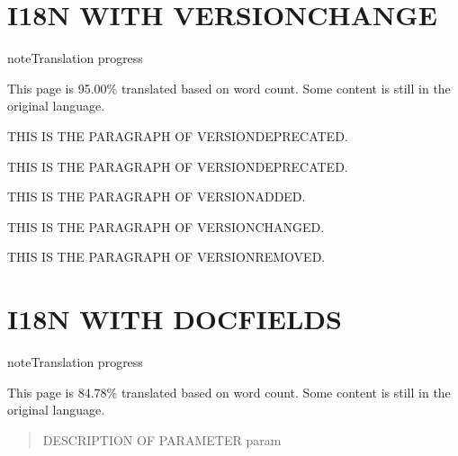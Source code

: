 \documentclass[letterpaper,10pt,english]{sphinxmanual}
\begin{document}
\sphinxstepscope


\chapter{I18N WITH VERSIONCHANGE}
\label{\detokenize{versionchange:i18n-with-versionchange}}\label{\detokenize{versionchange::doc}}
\begin{sphinxadmonition}{note}{Translation progress}

\sphinxAtStartPar
This page is 95.00\% translated based on word count. Some content is still in the original language.
\end{sphinxadmonition}

\sphinxAtStartPar
{}THIS IS THE  PARAGRAPH OF VERSION\sphinxhyphen{}DEPRECATED.

\sphinxAtStartPar
THIS IS THE  PARAGRAPH OF VERSION\sphinxhyphen{}DEPRECATED.

\sphinxAtStartPar
{}THIS IS THE  PARAGRAPH OF VERSION\sphinxhyphen{}ADDED.

\sphinxAtStartPar
{}THIS IS THE  PARAGRAPH OF VERSION\sphinxhyphen{}CHANGED.

\sphinxAtStartPar
{}THIS IS THE  PARAGRAPH OF VERSION\sphinxhyphen{}REMOVED.

\sphinxstepscope


\chapter{I18N WITH DOCFIELDS}
\label{\detokenize{docfields:i18n-with-docfields}}\label{\detokenize{docfields::doc}}
\begin{sphinxadmonition}{note}{Translation progress}

\sphinxAtStartPar
This page is 84.78\% translated based on word count. Some content is still in the original language.
\end{sphinxadmonition}


\begin{fulllineitems}

\pysigstartsignatures
\pysigline
{}
\pysigstopsignatures\begin{quote}\begin{description}
\sphinxAtStartPar
{} \sphinxhyphen{}\sphinxhyphen{} DESCRIPTION OF PARAMETER param

\end{description}\end{quote}

\end{fulllineitems}
\end{document}
